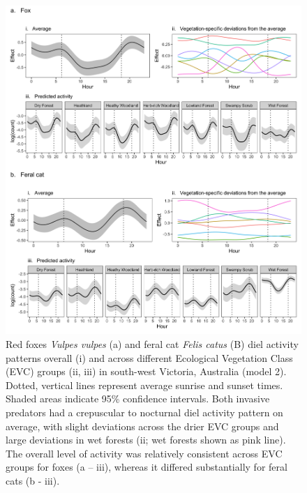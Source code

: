 \documentclass[]{elsarticle} %
\begin{document}
\begin{figure}

{\centering \includegraphics[width=1\linewidth]{../figs/predator_veg} 

}

\caption{Red foxes \textit{Vulpes vulpes} (a) and feral cat \textit{Felis catus} (B) diel activity patterns overall (i) and across different Ecological Vegetation Class (EVC) groups (ii, iii) in south-west Victoria, Australia (model 2). Dotted, vertical lines represent average sunrise and sunset times. Shaded areas indicate 95\% confidence intervals. Both invasive predators had a crepuscular to nocturnal diel activity pattern on average, with slight deviations across the drier EVC groups and large deviations in wet forests (ii; wet forests shown as pink line). The overall level of activity was relatively consistent across EVC groups for foxes (a – iii), whereas it differed substantially for feral cats (b - iii).}\label{fig:diel-veg}
\end{figure}

\newpage
\end{document}
